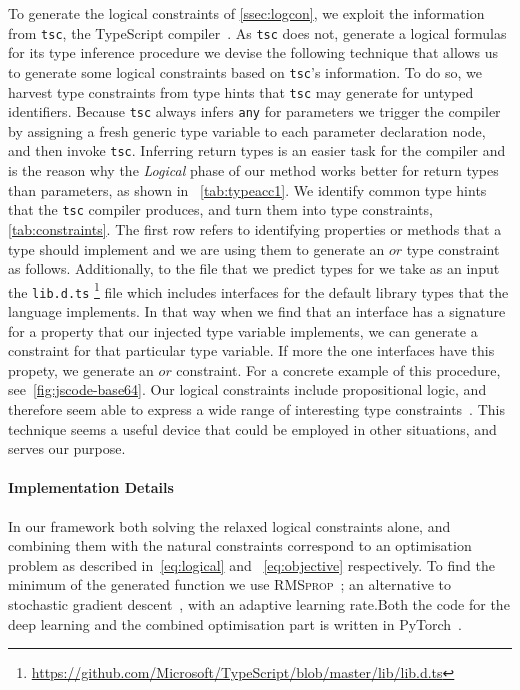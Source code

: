 \documentclass[acmsmall, review, anonymous]{acmart}\settopmatter{printfolios=true,printccs=false,printacmref=false}
\begin{document}
To generate the logical constraints of \cref{ssec:logcon}, we exploit the information from \lstinline+tsc+, the TypeScript compiler~\cite{typescript}. 
As \lstinline+tsc+ does not, generate a logical formulas 
for its type inference procedure we devise the following technique that allows us to generate some logical constraints based on \lstinline+tsc+'s information. To do so, we harvest type constraints from type hints that \lstinline+tsc+ may generate
for untyped identifiers. Because \lstinline+tsc+ always infers \texttt{\small{any}} for parameters we trigger
the compiler by assigning a fresh generic type variable to each parameter declaration node, and then invoke \lstinline+tsc+. 
Inferring return types is an easier task for the compiler and is the reason why the \textit{Logical} phase of our method works better for return types than parameters, as shown in ~\cref{tab:typeacc1}. 
We identify common type hints that the \lstinline+tsc+ compiler produces, and turn them into type constraints, \cref{tab:constraints}. The first row 
refers to identifying properties or methods that a type should implement
and we are using them to generate an $\mathrel{or}$ type constraint as follows. Additionally, to the file that we 
predict types for we take as an input the \lstinline{lib.d.ts} \footnote{\url{https://github.com/Microsoft/TypeScript/blob/master/lib/lib.d.ts}} file which includes interfaces for the default library types that the language implements. In that way when we find that an interface has a signature for a property that our injected type variable implements, we can generate a constraint for that particular type variable. If more the one interfaces have this propety, we generate an $\mathrel{or}$ constraint.
For a concrete example of this procedure, 
see~\cref{fig:jscode-base64}.
Our logical constraints include propositional logic, and therefore seem able to express a wide range of interesting type constraints~\citep{odersky99,pottier05}.
%
This technique seems a useful device that could be employed in other situations, and serves our purpose.
%

\paragraph{Implementation Details} 
In our framework both solving the relaxed logical constraints alone, and combining them with the natural constraints correspond to an optimisation 
problem as described in~\eqref{eq:logical} and
~\eqref{eq:objective} respectively. To find the minimum of the generated function we use 
\textsc{RMSprop}~\cite{tieleman2014};
an alternative to stochastic gradient descent~\cite{robbins51}, with an adaptive learning rate.Both the code for the deep
learning and the combined optimisation part is written in
PyTorch~\cite{paszke2017}.
\end{document}
